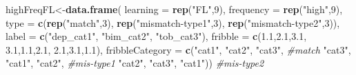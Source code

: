 \documentclass[
]{article}
\newenvironment{Shaded}{\begin{snugshade}}{\end{snugshade}}
\newcommand{\CommentTok}[1]{\textcolor[rgb]{0.56,0.35,0.01}{\textit{#1}}}
\newcommand{\DataTypeTok}[1]{\textcolor[rgb]{0.13,0.29,0.53}{#1}}
\newcommand{\DecValTok}[1]{\textcolor[rgb]{0.00,0.00,0.81}{#1}}
\newcommand{\FloatTok}[1]{\textcolor[rgb]{0.00,0.00,0.81}{#1}}
\newcommand{\KeywordTok}[1]{\textcolor[rgb]{0.13,0.29,0.53}{\textbf{#1}}}
\newcommand{\NormalTok}[1]{#1}
\newcommand{\StringTok}[1]{\textcolor[rgb]{0.31,0.60,0.02}{#1}}
\begin{document}
\begin{Shaded}
\begin{Highlighting}[]
\NormalTok{highFreqFL<-}\KeywordTok{data.frame}\NormalTok{(}
           \DataTypeTok{learning =} \KeywordTok{rep}\NormalTok{(}\StringTok{"FL"}\NormalTok{,}\DecValTok{9}\NormalTok{),}
           \DataTypeTok{frequency =} \KeywordTok{rep}\NormalTok{(}\StringTok{"high"}\NormalTok{,}\DecValTok{9}\NormalTok{),}
           \DataTypeTok{type =} \KeywordTok{c}\NormalTok{(}\KeywordTok{rep}\NormalTok{(}\StringTok{"match"}\NormalTok{,}\DecValTok{3}\NormalTok{), }
                    \KeywordTok{rep}\NormalTok{(}\StringTok{"mismatch-type1"}\NormalTok{,}\DecValTok{3}\NormalTok{), }
                    \KeywordTok{rep}\NormalTok{(}\StringTok{"mismatch-type2"}\NormalTok{,}\DecValTok{3}\NormalTok{)),}
           \DataTypeTok{label =} \KeywordTok{c}\NormalTok{(}\StringTok{"dep_cat1"}\NormalTok{, }\StringTok{"bim_cat2"}\NormalTok{, }\StringTok{"tob_cat3"}\NormalTok{),}
           \DataTypeTok{fribble =} \KeywordTok{c}\NormalTok{(}\FloatTok{1.1}\NormalTok{,}\FloatTok{2.1}\NormalTok{,}\FloatTok{3.1}\NormalTok{,}
                       \FloatTok{3.1}\NormalTok{,}\FloatTok{1.1}\NormalTok{,}\FloatTok{2.1}\NormalTok{,}
                       \FloatTok{2.1}\NormalTok{,}\FloatTok{3.1}\NormalTok{,}\FloatTok{1.1}\NormalTok{),}
           \DataTypeTok{fribbleCategory =} \KeywordTok{c}\NormalTok{(}\StringTok{"cat1"}\NormalTok{, }\StringTok{"cat2"}\NormalTok{, }\StringTok{"cat3"}\NormalTok{, }\CommentTok{#match}
                        \StringTok{"cat3"}\NormalTok{, }\StringTok{"cat1"}\NormalTok{, }\StringTok{"cat2"}\NormalTok{, }\CommentTok{#mis-type1}
                        \StringTok{"cat2"}\NormalTok{, }\StringTok{"cat3"}\NormalTok{, }\StringTok{"cat1"}\NormalTok{)) }\CommentTok{#mis-type2}


\end{Highlighting}
\end{Shaded}
\end{document}

